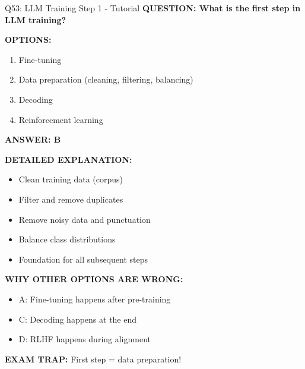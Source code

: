 \documentclass[8pt]{beamer}
\begin{document}
	\begin{frame}{Q53: LLM Training Step 1 - Tutorial}
		\fontsize{6.5}{7.5}\selectfont
		\textbf{QUESTION: What is the first step in LLM training?}
		
		\vspace{0.1cm}
		\textbf{OPTIONS:}
		\begin{enumerate}
			\item Fine-tuning
			\item Data preparation (cleaning, filtering, balancing)
			\item Decoding
			\item Reinforcement learning
		\end{enumerate}
		
		\vspace{0.1cm}
		\textcolor{myblue}{\textbf{ANSWER: B}}
		
		\vspace{0.1cm}
		\textbf{DETAILED EXPLANATION:}
		\begin{itemize}
			\item Clean training data (corpus)
			\item Filter and remove duplicates
			\item Remove noisy data and punctuation
			\item Balance class distributions
			\item Foundation for all subsequent steps
		\end{itemize}
		
		\vspace{0.1cm}
		\textcolor{myred}{\textbf{WHY OTHER OPTIONS ARE WRONG:}}
		\begin{itemize}
			\item \textcolor{myred}{A:} Fine-tuning happens after pre-training
			\item \textcolor{myred}{C:} Decoding happens at the end
			\item \textcolor{myred}{D:} RLHF happens during alignment
		\end{itemize}
		
		\textcolor{myred}{\textbf{EXAM TRAP:}} First step = \textcolor{myblue}{data preparation}!
	\end{frame}
	
\end{document}
